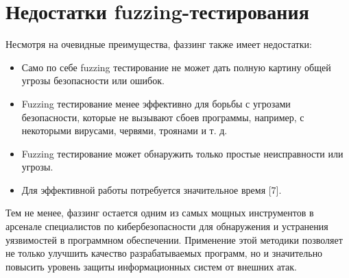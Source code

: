 


\section{Недостатки fuzzing-тестирования} \label{ch1:sec2} 
Несмотря на очевидные преимущества, фаззинг также имеет недостатки:
\begin{itemize}
	\item Само по себе fuzzing тестирование не может дать полную картину общей угрозы безопасности или ошибок.
	\item Fuzzing тестирование менее эффективно для борьбы с угрозами безопасности, которые не вызывают сбоев программы, например, с некоторыми вирусами, червями, троянами и т. д.
	\item Fuzzing тестирование может обнаружить только простые неисправности или угрозы.
	\item Для эффективной работы потребуется значительное время [7].
\end{itemize}
\par
 Тем не менее, фаззинг остается одним из самых мощных инструментов в арсенале специалистов по кибербезопасности для обнаружения и устранения уязвимостей в программном обеспечении. Применение этой методики позволяет не только улучшить качество разрабатываемых программ, но и значительно повысить уровень защиты информационных систем от внешних атак.
 
